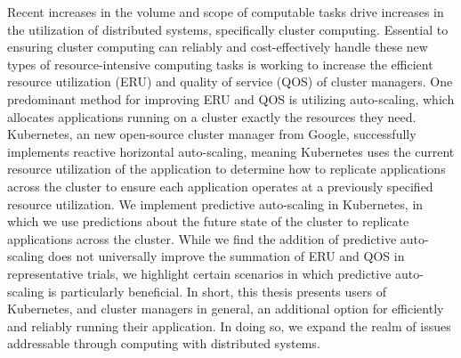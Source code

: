 Recent increases in the volume and scope of computable tasks drive increases in
the utilization of distributed systems, specifically cluster computing.
Essential to ensuring cluster computing can reliably and cost-effectively handle
these new types of resource-intensive computing tasks is working to increase the
efficient resource utilization (ERU) and quality of service (QOS) of cluster
managers. One predominant method for improving ERU and QOS is utilizing
auto-scaling, which allocates applications running on a cluster exactly the
resources they need. Kubernetes, an new open-source cluster manager from
Google, successfully implements reactive horizontal auto-scaling, meaning
Kubernetes uses the current resource utilization of
the application to determine how to
replicate applications across the cluster to ensure each application operates
at a previously specified resource utilization. We implement predictive
auto-scaling in Kubernetes, in which we use predictions about the future state
of the cluster to replicate applications across the cluster. While we find
the addition of predictive auto-scaling does not universally improve the
summation of ERU and QOS in representative trials, we highlight certain
scenarios in which predictive auto-scaling is particularly beneficial. In short,
this thesis presents users of Kubernetes, and cluster managers in general, an
additional option for efficiently and reliably running their application. In
doing so, we expand the realm of issues addressable through computing with
distributed systems.
